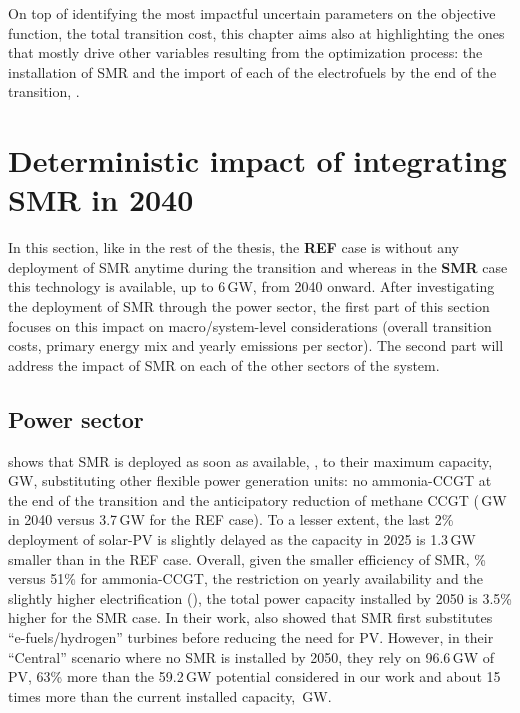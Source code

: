 On top of identifying the most impactful uncertain parameters on the objective function, \ie the total transition cost, this chapter aims also at highlighting the ones that mostly drive other variables resulting from the optimization process: the installation of \gls{SMR} and the import of each of the electrofuels by the end of the transition, .

\section{Deterministic impact of integrating \gls{SMR} in 2040}
\label{sec:atom_mol:results_deter} 
In this section, like in the rest of the thesis, the \textbf{REF} case is without any deployment of \gls{SMR} anytime during the transition and whereas in the \textbf{SMR} case this technology is available, up to 6\,GW, from 2040 onward. After investigating the deployment of \gls{SMR} through the power sector, the first part of this section focuses on this impact on macro/system-level considerations (\ie overall transition costs, primary energy mix and yearly emissions per sector). The second part will address the impact of \gls{SMR} on each of the other sectors of the system.

\subsection{Power sector}
\label{subsec:atom_mol:results_deter_power_sector}
 shows that \gls{SMR} is deployed as soon as available, , to their maximum capacity, \,GW, substituting other flexible power generation units: no ammonia-\gls{CCGT} at the end of the transition and the anticipatory reduction of methane \gls{CCGT} (\,GW in 2040 versus 3.7\,GW for the REF case). To a lesser extent, the last 2\% deployment of solar-\gls{PV} is slightly delayed as the capacity in 2025 is 1.3\,GW smaller than in the REF case. Overall, given the smaller efficiency of \gls{SMR}, \% versus 51\% for ammonia-\gls{CCGT}, the restriction on yearly availability and the slightly higher electrification (), the total power capacity installed by 2050 is 3.5\% higher for the SMR case. In their work, \citet{PATHS2050} also showed that \gls{SMR} first substitutes ``e-fuels/hydrogen'' turbines before reducing the need for \gls{PV}. However, in their ``Central'' scenario where no \gls{SMR} is installed by 2050, they rely on 96.6\,GW of \gls{PV}, 63\% more than the 59.2\,GW potential considered in our work and about 15 times more than the current installed capacity, \,GW. \\

